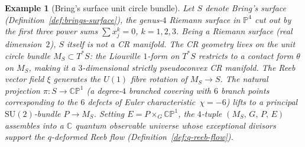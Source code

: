 \documentclass[12pt,a4paper]{report}
\newtheorem{example}[theorem]{Example}
\begin{document}
\begin{example}[Bring's surface unit circle bundle]
\label{ex:brings-surface}
Let $S$ denote Bring's surface (Definition~\ref{def:brings-surface}), the
genus-$4$ Riemann surface in $\mathbb{P}^4$ cut out by the first three power
sums $\sum x_j^k = 0$, $k=1,2,3$.  Being a Riemann surface (real
dimension~$2$), $S$ itself is not a CR manifold.  The CR geometry lives on the
unit circle bundle $M_S \subset T^*S$: the Liouville $1$-form on $T^*S$
restricts to a contact form $\theta$ on $M_S$, making it a $3$-dimensional
strictly pseudoconvex CR manifold.  The Reeb vector field $\xi$ generates the
$U(1)$ fibre rotation of $M_S \to S$.  The natural projection
$\pi\colon S \to \mathbb{CP}^1$ (a degree-$4$ branched covering with $6$
branch points corresponding to the $6$ defects of Euler
characteristic~$\chi=-6$) lifts to a principal $\mathrm{SU}(2)$-bundle
$P \to M_S$.  Setting $E = P \times_G \mathbb{CP}^1$, the $4$-tuple
$(M_S,\, G,\, P,\, E)$ assembles into a $\mathbb{C}$ quantum observable
universe whose exceptional divisors support the $q$-deformed Reeb flow
(Definition~\ref{def:q-reeb-flow}).
\end{example}
\end{document}
